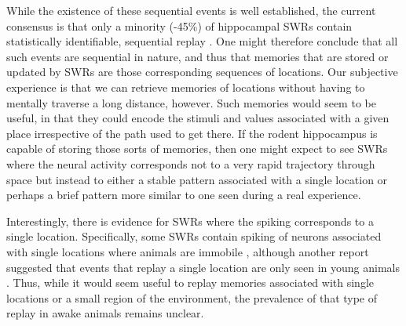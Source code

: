 \documentclass[9pt,lineno]{elife}
\begin{document}
While the existence of these sequential events is well established, the current consensus is that only a minority (-45\%) of hippocampal SWRs contain statistically identifiable, sequential replay \citep{MichonPostlearningHippocampalReplay2019, KaeferReplayBehavioralSequences2020, ShinDynamicsAwakeHippocampalPrefrontal2019, DavidsonHippocampalReplayExtended2009, Tingleymethodsreactivationreplay2020}. One might therefore conclude that all such events are sequential in nature, and thus that memories that are stored or updated by SWRs are those corresponding sequences of locations. Our subjective experience is that we can retrieve memories of locations without having to mentally traverse a long distance, however. Such memories would seem to be useful, in that they could encode the stimuli and values associated with a given place irrespective of the path used to get there. If the rodent hippocampus is capable of storing those sorts of memories, then one might expect to see SWRs where the neural activity corresponds not to a very rapid trajectory through space but instead to either a stable pattern associated with a single location or perhaps a brief pattern  more similar to one seen during a real experience. 

Interestingly, there is evidence for SWRs where the spiking corresponds to a single location. Specifically, some SWRs contain spiking of neurons associated with single locations where animals are immobile \citep{YuDistincthippocampalcorticalmemory2017}, although another report suggested that events that replay a single location are only seen in young animals \citep{StellaHippocampalReactivationRandom2019}. Thus, while it would seem useful to replay memories associated with single locations or a small region of the environment, the prevalence of that type of replay in awake animals remains unclear.
\end{document}
